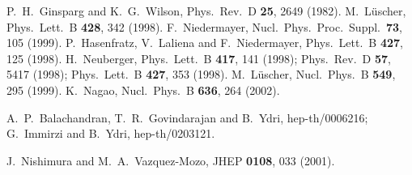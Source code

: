 \documentclass[a4paper,prl,showpacs,twocolumn]{revtex4}
\begin{document}
\begin{thebibliography}{all}
P.~H.~Ginsparg and K.~G.~Wilson,
Phys.\ Rev.\ D {\bf 25}, 2649 (1982).
M.~L\"uscher,
Phys.\ Lett.\ B {\bf 428}, 342 (1998).
F.~Niedermayer,
Nucl.\ Phys.\ Proc.\ Suppl.\  {\bf 73}, 105 (1999).
%
P.~Hasenfratz, V.~Laliena and F.~Niedermayer,
Phys.\ Lett.\ B {\bf 427}, 125 (1998).
H.~Neuberger,
Phys.\ Lett.\ B {\bf 417}, 141 (1998);
Phys.\ Rev.\ D {\bf 57}, 5417 (1998);
Phys.\ Lett.\ B {\bf 427}, 353 (1998).
M.~L\"uscher,
Nucl.\ Phys.\ B {\bf 549}, 295 (1999).
K.~Nagao,
Nucl.\ Phys.\ B {\bf 636}, 264 (2002).

A.~P.~Balachandran, T.~R.~Govindarajan and B.~Ydri,
hep-th/0006216;
%
G.~Immirzi and B.~Ydri,
hep-th/0203121.

J.~Nishimura and M.~A.~Vazquez-Mozo,
JHEP {\bf 0108}, 033 (2001).


\end{thebibliography}
\end{document}
